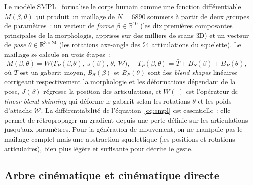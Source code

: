 \documentclass[12pt,a4paper,oneside]{report}
\theoremstyle{definition}
\theoremstyle{plain}
\newcommand{\R}{\mathbb{R}}
\begin{document}
Le modèle SMPL~\cite{loper2015smpl} formalise le corps humain comme une fonction
différentiable $M(\beta,\theta)$ qui produit un maillage de $N=6890$ sommets à
partir de deux groupes de paramètres~: un vecteur de \emph{forme}
$\beta\in\R^{10}$ (les dix premières composantes principales de la morphologie,
apprises sur des milliers de scans 3D) et un vecteur de \emph{pose}
$\theta\in\R^{3\times24}$ (les rotations axe-angle des 24 articulations du
squelette). Le maillage se calcule en trois étapes~:
\begin{equation}
M(\beta,\theta) = W\big(T_P(\beta,\theta),\, J(\beta),\, \theta,\, \mathcal{W}\big),
\quad
T_P(\beta,\theta) = \bar{T} + B_S(\beta) + B_P(\theta),
\label{eq:smpl}
\end{equation}
où $\bar{T}$ est un gabarit moyen, $B_S(\beta)$ et $B_P(\theta)$ sont des
\emph{blend shapes} linéaires corrigeant respectivement la morphologie et les
déformations dépendant de la pose, $J(\beta)$ régresse la position des
articulations, et $W(\cdot)$ est l'opérateur de \emph{linear blend skinning} qui
déforme le gabarit selon les rotations $\theta$ et les poids d'attache
$\mathcal{W}$. La différentiabilité de l'équation~\eqref{eq:smpl} est essentielle~:
elle permet de rétropropager un gradient depuis une perte définie sur les
articulations jusqu'aux paramètres. Pour la génération de mouvement, on ne
manipule pas le maillage complet mais une abstraction squelettique (les positions
et rotations articulaires), bien plus légère et suffisante pour décrire le geste.

\subsection{Arbre cinématique et cinématique directe}
\label{sub:fk}
\end{document}

